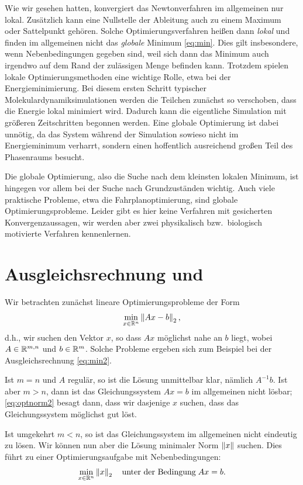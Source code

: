 Wie wir gesehen hatten, konvergiert das Newtonverfahren im allgemeinen
nur lokal. Zusätzlich kann eine Nullstelle der Ableitung auch zu einem
Maximum oder Sattelpunkt gehören. Solche Optimierungsverfahren heißen
dann \emph{lokal} und finden im allgemeinen
nicht das \emph{globale} Minimum \eqref{eq:min}. Dies gilt
insbesondere, wenn Nebenbedingungen gegeben sind, weil sich dann das
Minimum auch irgendwo auf dem Rand der zulässigen Menge befinden
kann. Trotzdem spielen lokale Optimierungsmethoden eine wichtige
Rolle, etwa bei der Energieminimierung. Bei diesem ersten Schritt
typischer Molekulardynamiksimulationen werden die Teilchen zunächst so
verschoben, dass die Energie lokal minimiert wird. Dadurch kann die
eigentliche Simulation mit größeren Zeitschritten begonnen
werden. Eine globale Optimierung ist dabei unnötig, da das System
während der Simulation sowieso nicht im Energieminimum verharrt,
sondern einen hoffentlich ausreichend großen Teil des Phasenraums
besucht.

Die globale Optimierung, also die Suche
nach dem kleinsten lokalen Minimum, ist hingegen vor allem bei der
Suche nach Grundzuständen wichtig. Auch viele praktische Probleme,
etwa die Fahrplanoptimierung, sind globale
Optimierungsprobleme. Leider gibt es hier keine Verfahren mit
gesicherten Konvergenzaussagen, wir werden aber zwei physikalisch
bzw.\ biologisch motivierte Verfahren kennenlernen.

\section{Ausgleichsrechnung und }

Wir betrachten zunächst lineare Optimierungsprobleme der Form
\begin{equation}
  \label{eq:optnorm2}
  \min_{x\in\mathbb{R}^n} \left\lVert{Ax-b}\right\rVert_2,
\end{equation}
d.h., wir suchen den Vektor $x$, so dass $Ax$ möglichst nahe an $b$
liegt, wobei $A\in\mathbb{R}^{m,n}$ und $b\in\mathbb{R}^{m}$.  Solche Probleme
ergeben sich zum Beispiel bei der Ausgleichsrechnung
\eqref{eq:min2}.

Ist $m = n$ und $A$ regulär, so ist die Lösung unmittelbar klar,
nämlich $A^{-1}b$. Ist aber $m>n$, dann ist das Gleichungssystem
$Ax=b$ im allgemeinen nicht lösbar; \eqref{eq:optnorm2} besagt dann,
dass wir dasjenige $x$ suchen, dass das Gleichungssystem möglichst gut
löst.

Ist umgekehrt $m < n$, so ist das Gleichungssystem im allgemeinen
nicht eindeutig zu lösen. Wir können nun aber die Lösung minimaler
Norm $\left\lVert{x}\right\rVert$ suchen. Dies führt zu einer Optimierungsaufgabe mit
Nebenbedingungen:
\begin{equation}
  \label{eq:optnorm2bild}
  \min_{x\in\mathbb{R}^n} \left\lVert{x}\right\rVert_2\quad\text{unter der Bedingung}\; Ax=b.
\end{equation}

